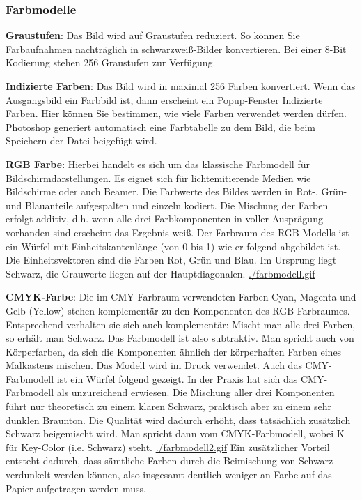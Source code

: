 \documentclass[11pt]{article}
\begin{document}
\subsubsection{Farbmodelle}
\label{sec:orgb42a74c}
\textbf{Graustufen}: Das Bild wird auf Graustufen reduziert. So können Sie Farbaufnahmen nachträglich in schwarzweiß-Bilder konvertieren. Bei einer 8-Bit Kodierung stehen 256 Graustufen zur Verfügung.

\textbf{Indizierte Farben}: Das Bild wird in maximal 256 Farben konvertiert. Wenn das Ausgangsbild ein Farbbild ist, dann erscheint ein Popup-Fenster Indizierte Farben. Hier können Sie bestimmen, wie viele Farben verwendet werden dürfen. Photoshop generiert automatisch eine Farbtabelle zu dem Bild, die beim Speichern der Datei beigefügt wird.

\textbf{RGB Farbe}: Hierbei handelt es sich um das klassische Farbmodell für Bildschirmdarstellungen. Es eignet sich für lichtemitierende Medien wie Bildschirme oder auch Beamer. Die Farbwerte des Bildes werden in Rot-, Grün- und Blauanteile aufgespalten und einzeln kodiert. Die Mischung der Farben erfolgt additiv, d.h. wenn alle drei Farbkomponenten in voller Ausprägung vorhanden sind erscheint das Ergebnis weiß. Der Farbraum des RGB-Modells ist ein Würfel mit Einheitskantenlänge (von 0 bis 1) wie er folgend abgebildet ist. Die Einheitsvektoren sind die Farben Rot, Grün und Blau. Im Ursprung liegt Schwarz, die Grauwerte liegen auf der Hauptdiagonalen.
\url{./farbmodell.gif}

\textbf{CMYK-Farbe}: Die im CMY-Farbraum verwendeten Farben Cyan, Magenta und Gelb (Yellow) stehen komplementär zu den Komponenten des RGB-Farbraumes. Entsprechend verhalten sie sich auch komplementär: Mischt man alle drei Farben, so erhält man Schwarz. Das Farbmodell ist also subtraktiv. Man spricht auch von Körperfarben, da sich die Komponenten ähnlich der körperhaften Farben eines Malkastens mischen. Das Modell wird im Druck verwendet.
Auch das CMY-Farbmodell ist ein Würfel folgend gezeigt. In der Praxis hat sich das CMY-Farbmodell als unzureichend erwiesen. Die Mischung aller drei Komponenten führt nur theoretisch zu einem klaren Schwarz, praktisch aber zu einem sehr dunklen Braunton. Die Qualität wird dadurch erhöht, dass tatsächlich zusätzlich Schwarz beigemischt wird. Man spricht dann vom CMYK-Farbmodell, wobei K für Key-Color (i.e. Schwarz) steht.
\url{./farbmodell2.gif}
Ein zusätzlicher Vorteil entsteht dadurch, dass sämtliche Farben durch die Beimischung von Schwarz verdunkelt werden können, also insgesamt deutlich weniger an Farbe auf das Papier aufgetragen werden muss.
\end{document}
